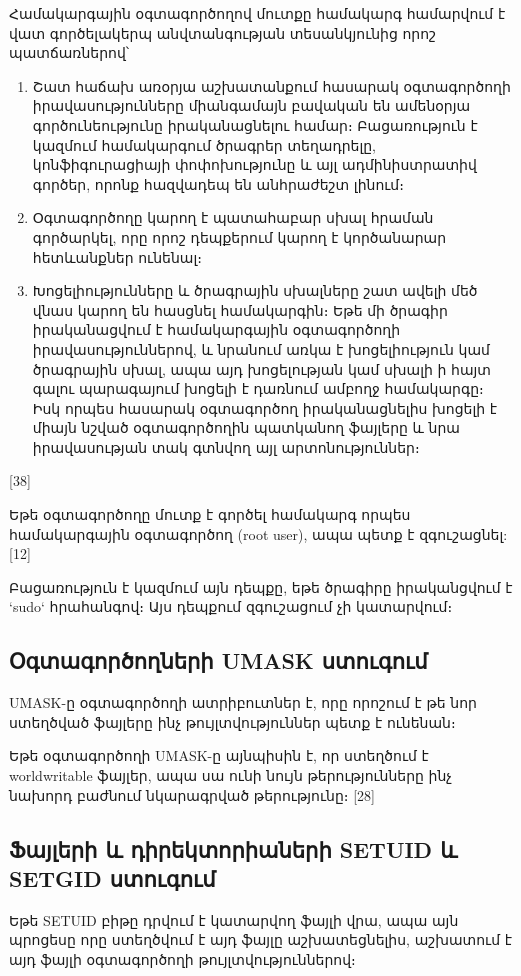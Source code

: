 \documentclass[a4paper,12pt]{article}
\begin{document}
\begin{sloppypar}
Համակարգային օգտագործողով մուտքը համակարգ համարվում է վատ
գործելակերպ անվտանգության տեսանկյունից որոշ պատճառներով՝
\begin{enumerate}
\item Շատ հաճախ առօրյա աշխատանքում հասարակ օգտագործողի իրավասությունները
	միանգամայն բավական են ամենօրյա գործունեությունը իրականացնելու համար։
	Բացառություն է կազմում համակարգում ծրագրեր տեղադրելը, կոնֆիգուրացիայի
	փոփոխությունը և այլ ադմինիստրատիվ գործեր, որոնք հազվադեպ են անհրաժեշտ
	լինում։
\item Օգտագործողը կարող է պատահաբար սխալ հրաման գործարկել, որը որոշ
	դեպքերում կարող է կործանարար հետևանքներ ունենալ։
\item Խոցելիությունները և ծրագրային սխալները շատ ավելի մեծ վնաս կարող են
	հասցնել համակարգին։ Եթե մի ծրագիր իրականացվում է համակարգային
	օգտագործողի իրավասություններով, և նրանում առկա է խոցելիություն կամ
	ծրագրային սխալ, ապա այդ խոցելության կամ սխալի ի հայտ գալու պարագայում
	խոցելի է դառնում ամբողջ համակարգը։ Իսկ որպես հասարակ օգտագործող
	իրականացնելիս խոցելի է միայն նշված օգտագործողին պատկանող ֆայլերը և
	նրա իրավասության տակ գտնվող այլ արտոնություններ։
\end{enumerate}
[38]

Եթե օգտագործողը մուտք է գործել համակարգ որպես
համակարգային օգտագործող (root user), ապա պետք է զգուշացնել: [12]

Բացառություն է կազմում այն դեպքը, եթե ծրագիրը իրականցվում է
`sudo` հրահանգով։ Այս դեպքում զգուշացում չի կատարվում։



\subsection{Օգտագործողների UMASK ստուգում}


UMASK-ը օգտագործողի ատրիբուտներ է, որը
որոշում է թե նոր ստեղծված ֆայլերը ինչ թույլտվություններ
պետք է ունենան։

Եթե օգտագործողի UMASK-ը այնպիսին է, որ ստեղծում է
worldwritable ֆայլեր, ապա սա ունի նույն թերությունները
ինչ նախորդ բաժնում նկարագրված թերությունը։
[28]


\subsection{Ֆայլերի և դիրեկտորիաների SETUID և SETGID ստուգում}


Եթե SETUID բիթը դրվում է կատարվող ֆայլի վրա, ապա
այն պրոցեսը որը ստեղծվում է այդ ֆայլը աշխատեցնելիս,
աշխատում է այդ ֆայլի օգտագործողի թույլտվություններով։


\end{sloppypar}
\end{document}
